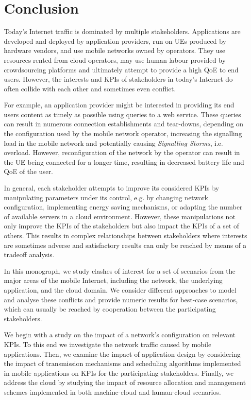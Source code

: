 \chapter{Conclusion}\label{chap:conclusion}

Today's Internet traffic is dominated by multiple stakeholders.
Applications are developed and deployed by application providers, run on \glspl{UE} produced by hardware vendors, and use mobile networks owned by operators.
They use resources rented from cloud operators, may use human labour provided by crowdsourcing platforms and ultimately attempt to provide a high \gls{QoE} to end users.
However, the interests and \glspl{KPI} of stakeholders in today's Internet do often collide with each other and sometimes even conflict.

For example, an application provider might be interested in providing its end users content as timely as possible using queries to a web service.
These queries can result in numerous connection establishments and tear-downs, depending on the configuration used by the mobile network operator, increasing the signalling load in the mobile network and potentially causing \emph{Signalling Storms}, i.e. overload.
However, reconfiguration of the network by the operator can result in the \gls{UE} being connected for a longer time, resulting in decreased battery life and \gls{QoE} of the user.

In general, each stakeholder attempts to improve its considered \glspl{KPI} by manipulating parameters under its control, e.g. by changing network configuration, implementing energy saving mechanisms, or adapting the number of available servers in a cloud environment.
However, these manipulations not only improve the \glspl{KPI} of the stakeholders but also impact the \glspl{KPI} of a set of others.
This results in complex relationships between stakeholders where interests are sometimes adverse and satisfactory results can only be reached by means of a tradeoff analysis.

In this monograph, we study clashes of interest for a set of scenarios from the major areas of the mobile Internet, including the network, the underlying application, and the cloud domain.
We consider different approaches to model and analyse these conflicts and provide numeric results for best-case scenarios, which can usually be reached by cooperation between the participating stakeholders.

We begin with a study on the impact of a network's configuration on relevant \glspl{KPI}.
To this end we investigate the network traffic caused by mobile applications.
Then, we examine the impact of application design by considering the impact of transmission mechanisms and scheduling algorithms implemented in mobile applications on \glspl{KPI} for the participating stakeholders.
Finally, we address the cloud by studying the impact of resource allocation and management schemes implemented in both machine-cloud and human-cloud scenarios.

